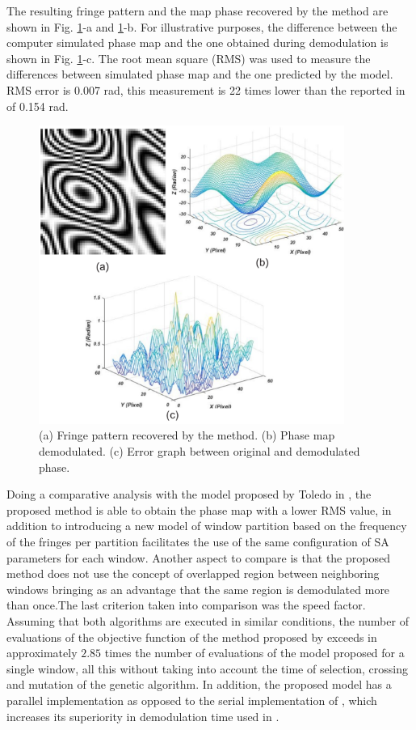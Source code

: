 \documentclass[review]{elsarticle}
\begin{document}
The resulting fringe pattern and the map phase recovered by the method are shown in Fig. \ref{Fig5}-a and \ref{Fig5}-b. For illustrative purposes, the difference between the computer simulated phase map and the one obtained during demodulation is shown in Fig. \ref{Fig5}-c. The root mean square (RMS) was used to measure the differences between simulated phase map and the one predicted by the model. RMS error is 0.007 rad, this measurement is 22 times lower than the reported in \cite{Toledo2008} of 0.154 rad.
\begin{figure}[ht!]
\centering\includegraphics[width=10cm]{fig5}
\caption{(a) Fringe pattern recovered by the method. (b) Phase map demodulated. (c) Error graph between original and demodulated phase.}
\label{Fig5}
\end{figure}

Doing a comparative analysis with the model proposed by Toledo in \cite{Toledo2008}, the proposed method is able to obtain the phase map with a lower RMS value, in addition to introducing a new model of window partition based on the frequency of the fringes per partition facilitates the use of the same configuration of SA parameters for each window. Another aspect to compare is that the proposed method does not use the concept of overlapped region between neighboring windows bringing as an advantage that the same region is demodulated more than once.The last criterion taken into comparison was the speed factor. Assuming that both algorithms are executed in similar conditions, the number of evaluations of the objective function of the method proposed by \cite{Toledo2008} exceeds in approximately $2.85$ times the number of evaluations of the model proposed for a single window, all this without taking into account the time of selection, crossing and mutation of the genetic algorithm. In addition, the proposed model has a parallel implementation as opposed to the serial implementation of \cite{Toledo2008}, which increases its superiority in demodulation time used in \cite{Toledo2008}.
\end{document}
